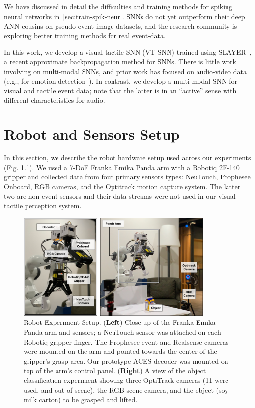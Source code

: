 \documentclass[fyp]{socreport}
\begin{document}
We have discussed in detail the difficulties and training methods for spiking
neural networks in~\autoref{sec:train-spik-neur}. SNNs do not yet outperform
their deep ANN cousins on pseudo-event image datasets, and the research
community is exploring better training methods for real event-data.

In this work, we develop a visual-tactile SNN (VT-SNN) trained using
SLAYER~\cite{NIPS2018_7415}, a recent approximate backpropagation method for
SNNs. There is little work involving on multi-modal SNNs, and prior work has
focused on audio-video data~\cite{chevallier2005distributed,Rathi2018} (e.g.,
for emotion detection~\cite{mansouri2019speech}). In contrast, we develop a
multi-modal SNN for visual and tactile event data; note that the latter is in an
``active'' sense with different characteristics for audio.

\chapter{Robot and Sensors Setup\label{cha:exp_setup}}

In this section, we describe the robot hardware setup used across our
experiments (Fig. \ref{fig:robotsetup}). We used a 7-DoF Franka Emika Panda arm
with a Robotiq 2F-140 gripper and collected data from four primary sensors
types: NeuTouch, Prophesee Onboard, RGB cameras, and the Optitrack motion
capture system. The latter two are non-event sensors and their data streams were
not used in our visual-tactile perception system.

\begin{figure}
  \centering
  \includegraphics[width=0.86\textwidth]{images/robotsetup/robot_setup_wsensors.pdf}
  \caption{Robot Experiment Setup. (\textbf{Left}) Close-up of the Franka Emika
    Panda arm and sensors; a NeuTouch sensor was attached on each Robotiq
    gripper finger. The Prophesee event and Realsense cameras were mounted on
    the arm and pointed towards the center of the gripper's grasp area. Our
    prototype ACES decoder was mounted on top of the arm's control panel.
    (\textbf{Right}) A view of the object classification experiment showing
    three OptiTrack cameras (11 were used, and out of scene), the RGB scene
    camera, and the object (soy milk carton) to be grasped and lifted.}
\label{fig:robotsetup}
\end{figure}
\end{document}

